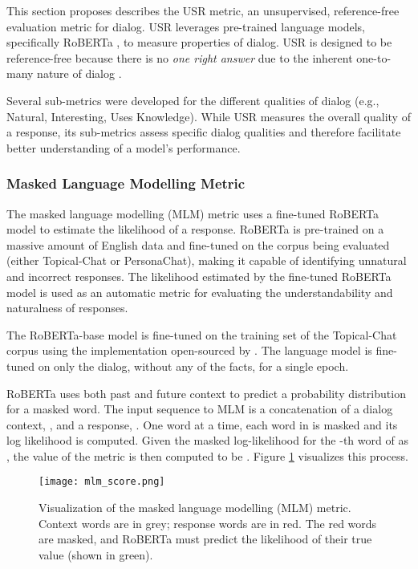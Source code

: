 \documentclass[11pt,a4paper]{article}
\begin{document}
This section proposes describes the USR metric, an unsupervised, reference-free evaluation metric for dialog. USR leverages pre-trained language models, specifically RoBERTa \citep{liu2019roberta}, to measure properties of dialog. USR is designed to be reference-free because there is no \textit{one right answer} due to the inherent one-to-many nature of dialog \citep{zhao2017learning}. 

Several sub-metrics were developed for the different qualities of dialog (e.g., Natural, Interesting, Uses Knowledge). While USR measures the overall quality of a response, its sub-metrics assess specific dialog qualities and therefore facilitate better understanding of a model's performance. 



\subsubsection{Masked Language Modelling Metric}
\label{mlm}

The masked language modelling (MLM) metric uses a fine-tuned RoBERTa \citep{liu2019roberta} model to estimate the likelihood of a response. RoBERTa is pre-trained on a massive amount of English data and fine-tuned on the corpus being evaluated (either Topical-Chat or PersonaChat), making it capable of identifying unnatural and incorrect responses. The likelihood estimated by the fine-tuned RoBERTa model is used as an automatic metric for evaluating the understandability and naturalness of responses.


The RoBERTa-base model \citep{liu2019roberta} is fine-tuned on the training set of the Topical-Chat corpus \citep{gopalakrishnan2019topical} using the implementation open-sourced by \citet{Wolf2019HuggingFacesTS}. The language model is fine-tuned on only the dialog, without any of the facts, for a single epoch.

RoBERTa uses both past and future context to predict a probability distribution for a masked word. The input sequence to MLM is a concatenation of a dialog context, , and a response, . One word at a time, each word in  is masked and its log likelihood is computed. Given the masked log-likelihood for the -th word of  as , the value of the metric is then computed to be . Figure \ref{fig:mlm_score} visualizes this process.







\begin{figure}
    \centering
    \texttt{[image: mlm\_score.png]}
    \caption{Visualization of the masked language modelling (MLM) metric. Context words are in grey; response words are in red. The red words are masked, and RoBERTa must predict the likelihood of their true value (shown in green).}
    \label{fig:mlm_score}
\end{figure}
\end{document}
